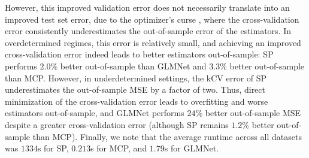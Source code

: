 \documentclass[ijoc,noblindrev]{informs3} %
\begin{document}
However, this improved validation error does not necessarily translate into an improved test set error, due to the optimizer's curse \citep[cf.][]{smith2006optimizer, cawley2010over}, where the cross-validation error consistently underestimates the out-of-sample error of the estimators. In overdetermined regimes, this error is relatively small, and achieving an improved cross-validation error indeed leads to better estimators out-of-sample: SP performs $2.0\%$ better out-of-sample than GLMNet and $3.3\%$ better out-of-sample than MCP. However, in underdetermined settings, the kCV error of SP underestimates the out-of-sample MSE by a factor of two. Thus, direct minimization of the cross-validation error leads to overfitting and worse estimators out-of-sample, and GLMNet performs $24\%$ better out-of-sample MSE despite a greater cross-validation error (although SP remains $1.2\%$ better out-of-sample than MCP). Finally, we note that the average runtime across all datasets was $1334$s for SP, $0.213$s for MCP, and $1.79$s for GLMNet.
\end{document}
